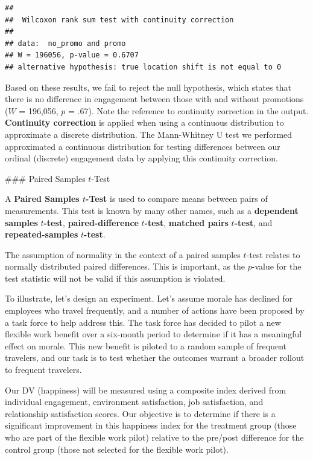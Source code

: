 \documentclass[]{book}
\begin{document}
\begin{verbatim}
## 
##  Wilcoxon rank sum test with continuity correction
## 
## data:  no_promo and promo
## W = 196056, p-value = 0.6707
## alternative hypothesis: true location shift is not equal to 0
\end{verbatim}

Based on these results, we fail to reject the null hypothesis, which states that there is no difference in engagement between those with and without promotions (\(W\) = 196,056, \(p\) = .67). Note the reference to continuity correction in the output. \textbf{Continuity correction} is applied when using a continuous distribution to approximate a discrete distribution. The Mann-Whitney U test we performed approximated a continuous distribution for testing differences between our ordinal (discrete) engagement data by applying this continuity correction.

\#\#\# Paired Samples \(t\)-Test

A \textbf{Paired Samples \(t\)-Test} is used to compare means between pairs of measurements. This test is known by many other names, such as a \textbf{dependent samples} \(t\)\textbf{-test}, \textbf{paired-difference} \(t\)\textbf{-test}, \textbf{matched pairs} \(t\)\textbf{-test}, and \textbf{repeated-samples} \(t\)\textbf{-test}.

The assumption of normality in the context of a paired samples \(t\)-test relates to normally distributed paired differences. This is important, as the \(p\)-value for the test statistic will not be valid if this assumption is violated.

To illustrate, let's design an experiment. Let's assume morale has declined for employees who travel frequently, and a number of actions have been proposed by a task force to help address this. The task force has decided to pilot a new flexible work benefit over a six-month period to determine if it has a meaningful effect on morale. This new benefit is piloted to a random sample of frequent travelers, and our task is to test whether the outcomes warrant a broader rollout to frequent travelers.

Our DV (happiness) will be measured using a composite index derived from individual engagement, environment satisfaction, job satisfaction, and relationship satisfaction scores. Our objective is to determine if there is a significant improvement in this happiness index for the treatment group (those who are part of the flexible work pilot) relative to the pre/post difference for the control group (those not selected for the flexible work pilot).
\end{document}
